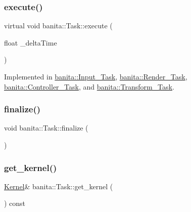 \mbox{\label{classbanita_1_1_task_aa79a45c9cbfac80ec9e4f060d5d444aa}} 
\subsubsection{\texorpdfstring{execute()}{execute()}}
{\footnotesize\ttfamily virtual void banita\+::\+Task\+::execute (\begin{DoxyParamCaption}\item[{float}]{\+\_\+delta\+Time }\end{DoxyParamCaption})\hspace{0.3cm}{\ttfamily [pure virtual]}}



Implemented in \mbox{\hyperlink{classbanita_1_1_input___task_a68a88772e60109b5d461b2a75f05ee35}{banita\+::\+Input\+\_\+\+Task}}, \mbox{\hyperlink{classbanita_1_1_render___task_a94a8e1921a653ec6da9d1797ad2abcab}{banita\+::\+Render\+\_\+\+Task}}, \mbox{\hyperlink{classbanita_1_1_controller___task_a7391e5e47d43ac832fdff9912e140815}{banita\+::\+Controller\+\_\+\+Task}}, and \mbox{\hyperlink{classbanita_1_1_transform___task_a63ce627e86225d2264093ce932706074}{banita\+::\+Transform\+\_\+\+Task}}.

\mbox{\label{classbanita_1_1_task_a5c635a75f1a8b735354d458684838d5b}} 
\subsubsection{\texorpdfstring{finalize()}{finalize()}}
{\footnotesize\ttfamily void banita\+::\+Task\+::finalize (\begin{DoxyParamCaption}{ }\end{DoxyParamCaption})\hspace{0.3cm}{\ttfamily [inline]}}

\mbox{\label{classbanita_1_1_task_acce4efa4b9ded5502ee9a70093f87855}} 
\subsubsection{\texorpdfstring{get\_kernel()}{get\_kernel()}}
{\footnotesize\ttfamily \mbox{\hyperlink{classbanita_1_1_kernel}{Kernel}}\& banita\+::\+Task\+::get\+\_\+kernel (\begin{DoxyParamCaption}{ }\end{DoxyParamCaption}) const\hspace{0.3cm}{\ttfamily [inline]}}

